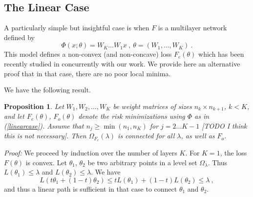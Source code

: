 \documentclass{article} %
\newcommand {\Fem} {F_{e}}
\newcommand {\Forr} {F_{o}}
\newtheorem{proposition}[theorem]{Proposition}
\begin{document}
\subsection{The Linear Case}

A particularly simple but insightful case is 
when $F$ is a multilayer network defined by
\begin{equation}
\label{linearcase}
\Phi(x;\theta) = W_K \dots W_1 x~,~\theta = (W_1, \dots, W_K)~.
\end{equation}
This model defines a non-convex (and non-concave) loss $\Fem(\theta)$ 
which has been recently studied in \cite{linearcase} concurrently with our work. 
We provide here an alternative proof that in that case, there are no poor local 
minima.


We have the following result.
\begin{proposition}
\label{proplinear}
Let $W_1, W_2, \dots, W_K$ be weight matrices of sizes 
$n_k \times n_{k+1}$, $k < K$, and let $\Fem(\theta)$, $\Forr(\theta)$ 
denote the risk minimizations using $\Phi$ as in (\ref{linearcase}).
Assume that $n_j \geq \min(n_1, n_K)$ for $j=2 \dots K-1$ [TODO I think this is not necessary].
Then $\Omega_{\Fem}(\lambda)$ is connected for all $\lambda$, as well as $\Forr$. 
\end{proposition}
{\it Proof:} We proceed by induction over the number of layers $K$. 
For $K=1$, the loss $F(\theta)$ is convex. Let  $\theta_1$, $\theta_2$ be two arbitrary points 
in a level set $\Omega_\lambda$. Thus $L(\theta_1) \leq \lambda$ and $L(\theta_2) \leq \lambda$. We have
$$L( t \theta_1 + (1-t) \theta_2) \leq t L(\theta_1) + (1-t) L(\theta_2) \leq \lambda~,$$
and thus a linear path is sufficient in that case to connect $\theta_1$ and $\theta_2$.
\end{document}
